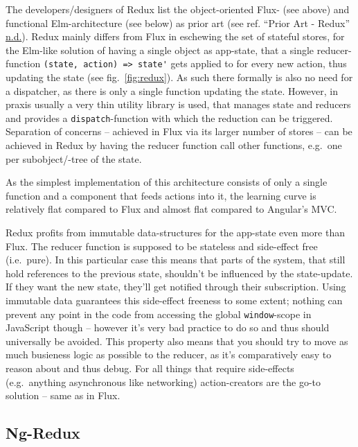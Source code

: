 \documentclass[a4paper,,tablecaptionabove]{scrbook}
\newcommand{\passthrough}[1]{#1}
\begin{document}
The developers/designers of Redux list the object-oriented Flux- (see
above) and functional Elm-architecture (see below) as prior art (see
ref. ``Prior Art - Redux'' \protect\hyperlink{ref-PriorArtRedux}{n.d.}).
Redux mainly differs from Flux in eschewing the set of stateful stores,
for the Elm-like solution of having a single object as app-state, that a
single reducer-function
\passthrough{\lstinline!(state, action) => state'!} gets applied to for
every new action, thus updating the state (see fig.~\ref{fig:redux}). As
such there formally is also no need for a dispatcher, as there is only a
single function updating the state. However, in praxis usually a very
thin utility library is used, that manages state and reducers and
provides a \passthrough{\lstinline!dispatch!}-function with which the
reduction can be triggered. Separation of concerns -- achieved in Flux
via its larger number of stores -- can be achieved in Redux by having
the reducer function call other functions, e.g.~one per subobject/-tree
of the state.

As the simplest implementation of this architecture consists of only a
single function and a component that feeds actions into it, the learning
curve is relatively flat compared to Flux and almost flat compared to
Angular's MVC.

Redux profits from immutable data-structures for the app-state even more
than Flux. The reducer function is supposed to be stateless and
side-effect free (i.e.~pure). In this particular case this means that
parts of the system, that still hold references to the previous state,
shouldn't be influenced by the state-update. If they want the new state,
they'll get notified through their subscription. Using immutable data
guarantees this side-effect freeness to some extent; nothing can prevent
any point in the code from accessing the global
\passthrough{\lstinline!window!}-scope in JavaScript though -- however
it's very bad practice to do so and thus should universally be avoided.
This property also means that you should try to move as much busieness
logic as possible to the reducer, as it's comparatively easy to reason
about and thus debug. For all things that require side-effects
(e.g.~anything asynchronous like networking) action-creators are the
go-to solution -- same as in Flux.

\hypertarget{sec:ng-redux}{%
\subsection{Ng-Redux}\label{sec:ng-redux}}
\end{document}
